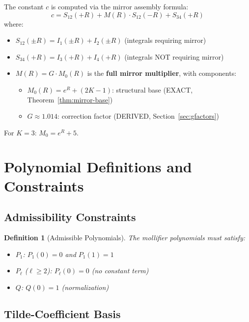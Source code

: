 \documentclass[11pt]{article}
\newtheorem{definition}{Definition}
\begin{document}
The constant $c$ is computed via the mirror assembly formula:
\begin{equation}
\boxed{c = S_{12}(+R) + M(R) \cdot S_{12}(-R) + S_{34}(+R)}
\end{equation}
where:
\begin{itemize}
\item $S_{12}(\pm R) = I_1(\pm R) + I_2(\pm R)$ (integrals requiring mirror)
\item $S_{34}(+R) = I_3(+R) + I_4(+R)$ (integrals NOT requiring mirror)
\item $M(R) = G \cdot M_0(R)$ is the \textbf{full mirror multiplier}, with components:
  \begin{itemize}
  \item $M_0(R) = e^R + (2K-1)$: structural base (EXACT, Theorem~\ref{thm:mirror-base})
  \item $G \approx 1.014$: correction factor (DERIVED, Section~\ref{sec:gfactors})
  \end{itemize}
\end{itemize}

For $K=3$: $M_0 = e^R + 5$.

\section{Polynomial Definitions and Constraints}
\label{sec:polynomials}

\subsection{Admissibility Constraints}

\begin{definition}[Admissible Polynomials]
The mollifier polynomials must satisfy:
\begin{itemize}
\item $P_1$: $P_1(0) = 0$ and $P_1(1) = 1$
\item $P_\ell$ ($\ell \geq 2$): $P_\ell(0) = 0$ (no constant term)
\item $Q$: $Q(0) = 1$ (normalization)
\end{itemize}
\end{definition}

\subsection{Tilde-Coefficient Basis}
\end{document}
